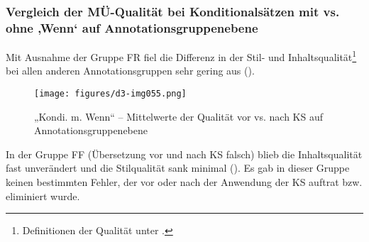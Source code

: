 \subsubsection{Vergleich der MÜ-Qualität bei Konditionalsätzen mit vs. ohne ‚Wenn‘ auf Annotationsgruppenebene}
\label{sec:5.3.3.5}

Mit Ausnahme der Gruppe FR fiel die Differenz in der Stil- und Inhaltsqualität\footnote{\textrm{Definitionen der Qualität unter .}} bei allen anderen Annotationsgruppen sehr gering aus ().


\begin{figure}

\texttt{[image: figures/d3-img055.png]}


\caption{\label{fig:05:57}„Kondi. m. Wenn“ -- Mittelwerte der Qualität vor vs. nach KS auf Annotationsgruppenebene   }
\end{figure}

In der Gruppe FF (Übersetzung vor und nach KS falsch) blieb die Inhaltsqualität fast unverändert und die Stilqualität sank minimal (). Es gab in dieser Gruppe keinen bestimmten Fehler, der vor oder nach der Anwendung der KS auftrat bzw. eliminiert wurde.


